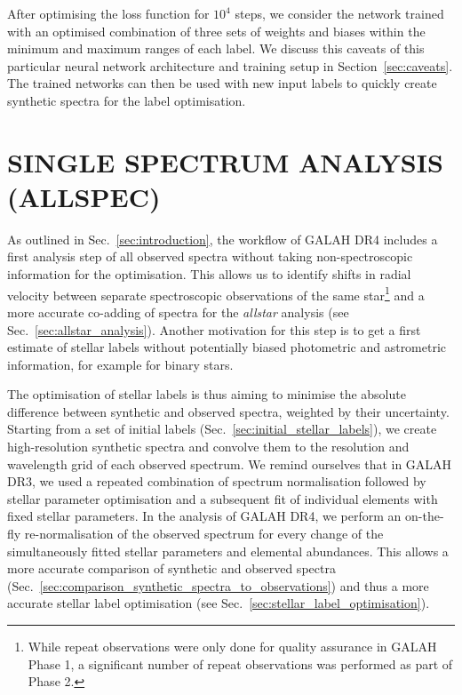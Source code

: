 \documentclass[
  journal=pasa,
  manuscript=research-paper, %
  year=2024,
  volume=37
]{cup-journal}
\begin{document}
After optimising the loss function for $10^4$ steps, we consider the network trained with an optimised combination of three sets of weights and biases within the minimum and maximum ranges of each label. We discuss this caveats of this particular neural network architecture and training setup in Section~\ref{sec:caveats}. The trained networks can then be used with new input labels to quickly create synthetic spectra for the label optimisation.

\section{SINGLE SPECTRUM ANALYSIS (ALLSPEC)}
\label{sec:allspec_analysis}

As outlined in Sec.~\ref{sec:introduction}, the workflow of GALAH DR4 includes a first analysis step of all observed spectra without taking non-spectroscopic information for the optimisation. This allows us to identify shifts in radial velocity between separate spectroscopic observations of the same star\footnote{While repeat observations were only done for quality assurance in GALAH Phase 1, a significant number of repeat observations was performed as part of Phase 2.} and a more accurate co-adding of spectra for the \textit{allstar} analysis (see Sec.~\ref{sec:allstar_analysis}). Another motivation for this step is to get a first estimate of stellar labels without potentially biased photometric and astrometric information, for example for binary stars.

The optimisation of stellar labels is thus aiming to minimise the absolute difference between synthetic and observed spectra, weighted by their uncertainty. Starting from a set of initial labels (Sec.~\ref{sec:initial_stellar_labels}), we create high-resolution synthetic spectra and convolve them to the resolution and wavelength grid of each observed spectrum. We remind ourselves that in GALAH DR3, we used a repeated combination of spectrum normalisation followed by stellar parameter optimisation and a subsequent fit of individual elements with fixed stellar parameters. In the analysis of GALAH DR4, we perform an on-the-fly re-normalisation of the observed spectrum for every change of the simultaneously fitted stellar parameters and elemental abundances. This allows a more accurate comparison of synthetic and observed spectra (Sec.~\ref{sec:comparison_synthetic_spectra_to_observations}) and thus a more accurate stellar label optimisation (see Sec.~\ref{sec:stellar_label_optimisation}).
\end{document}
